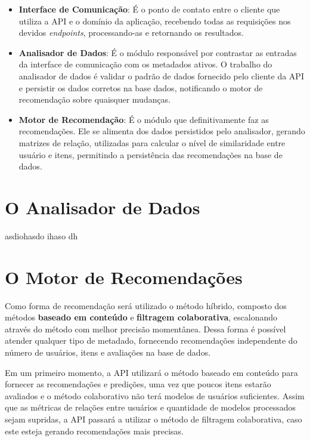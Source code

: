 \documentclass[12pt, openright, oneside, a4paper, brazil]{abntex2}
\begin{document}
\begin{itemize}

	\item \textbf{Interface de Comunicação}: É o ponto de contato entre o cliente que utiliza a API e o domínio da aplicação, recebendo todas as requisições nos devidos \textit{endpoints}, processando-as e retornando os resultados.
	
	\item \textbf{Analisador de Dados}: É o módulo responsável por contrastar as entradas da interface de comunicação com os metadados ativos. O trabalho do analisador de dados é validar o padrão de dados fornecido pelo cliente da API e persistir os dados corretos na base dados, notificando o motor de recomendação sobre quaisquer mudanças.

	\item \textbf{Motor de Recomendação}: É o módulo que definitivamente faz as recomendações. Ele se alimenta dos dados persistidos pelo analisador, gerando matrizes de relação, utilizadas para calcular o nível de similaridade entre usuário e itens, permitindo a persistência das recomendações na base de dados.
	
\end{itemize}

\section{O Analisador de Dados} \label{analisador}
 asdiohasdo ihaso dh

\section{O Motor de Recomendações} \label{motor}

Como forma de recomendação será utilizado o método híbrido, composto dos métodos \textbf{baseado em conteúdo} e \textbf{filtragem colaborativa}, escalonando através do método com melhor precisão momentânea. Dessa forma é possível atender qualquer tipo de metadado, fornecendo recomendações independente do número de usuários, itens e avaliações na base de dados.

Em um primeiro momento, a API utilizará o método baseado em conteúdo para fornecer as recomendações e predições, uma vez que poucos itens estarão avaliados e o método colaborativo não terá modelos de usuários suficientes. Assim que as métricas de relações entre usuários e quantidade de modelos processados sejam supridas, a API passará a utilizar o método de filtragem colaborativa, caso este esteja gerando recomendações mais precisas.
\end{document}
